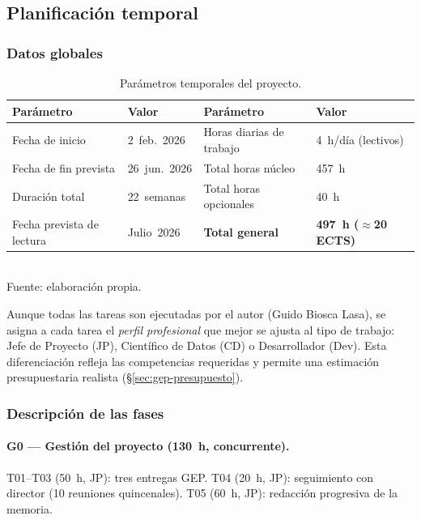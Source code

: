 \subsection{Planificación temporal}
\label{sec:gep-planificacion}

\subsubsection{Datos globales}

\begin{table}[H]
\centering
\caption{Parámetros temporales del proyecto.}
\label{tab:gep-globales}
\small
\begin{tabular}{@{}ll@{\quad}ll@{}}
\toprule
\textbf{Parámetro}          & \textbf{Valor}        & \textbf{Parámetro}                  & \textbf{Valor} \\
\midrule
Fecha de inicio              & 2~feb.\ 2026          & Horas diarias de trabajo            & 4~h/día (lectivos) \\
Fecha de fin prevista        & 26~jun.\ 2026         & Total horas núcleo                  & 457~h \\
Duración total               & 22~semanas            & Total horas opcionales              & 40~h \\
Fecha prevista de lectura    & Julio~2026            & \textbf{Total general}              & \textbf{497~h ($\approx$20 ECTS)} \\
\bottomrule
\end{tabular}
\\[0.15cm]{\small Fuente: elaboración propia.}
\end{table}

Aunque todas las tareas son ejecutadas por el autor (Guido Biosca
Lasa), se asigna a cada tarea el \emph{perfil profesional} que mejor
se ajusta al tipo de trabajo: Jefe de Proyecto (JP), Científico de
Datos (CD) o Desarrollador (Dev). Esta diferenciación refleja las
competencias requeridas y permite una estimación presupuestaria
realista (\S\ref{sec:gep-presupuesto}).

\subsubsection{Descripción de las fases}

\paragraph{G0 --- Gestión del proyecto (130~h, concurrente).}
T01--T03 (50~h, JP): tres entregas GEP. T04 (20~h, JP): seguimiento
con director (10 reuniones quincenales). T05 (60~h, JP): redacción
progresiva de la memoria.

